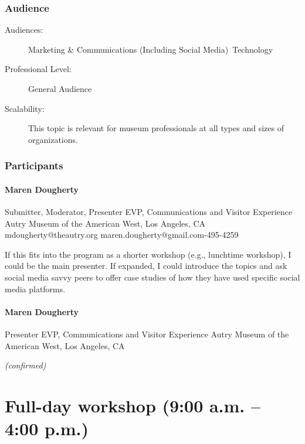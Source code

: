 \documentclass{report}
\begin{document}
              \subsection*{Audience}
                \begin{description}
                  \item [Audiences:]Marketing \& Communications (Including Social Media)~Technology~
                  \item[Professional Level:]General Audience~
                \item[Scalability:] This topic is relevant for museum professionals at all types and sizes of organizations.

							
              \end{description}
            \subsection*{Participants}
              \subsubsection*{ Maren Dougherty }
              Submitter, Moderator, Presenter\newline
              EVP, Communications and Visitor Experience\newline
              Autry Museum of the American West, Los Angeles, CA
              \newline
              mdougherty@theautry.org\newline
              maren.dougherty@gmail.com-495-4259\newline

              If this fits into the program as a shorter workshop (e.g., lunchtime workshop), I could be the main presenter. If expanded, I could introduce the topics and ask social media savvy peers to offer case studies of how they have used specific social media platforms.\newline


              

              
                \subsubsection*{ Maren Dougherty }
                Presenter\newline
                EVP, Communications and Visitor Experience\newline
                Autry Museum of the American West, Los Angeles, CA
                \newline
                
                
                

                
                \emph{ (confirmed) }
              

              

              

              
        
    \newpage
    \chapter*{ Full-day workshop (9:00 a.m. – 4:00 p.m.) }

      
        
        
\end{document}
